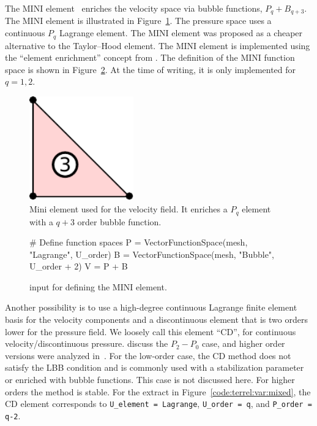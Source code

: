 The MINI element~\citep{ArnoldBrezziFortin1984} enriches the velocity
space via bubble functions, $P_q + B_{q+3}$. The MINI element is
illustrated in Figure~\ref{fig:terrel:MINIElement}.  The pressure
space uses a continuous $P_{q}$ Lagrange element.  The MINI element
was proposed as a cheaper alternative to the Taylor--Hood element. The
MINI element is implemented using the ``element enrichment'' concept
from \ufl{}. The \ufl{} definition of the MINI function space is shown
in Figure~\ref{code:terrel:MINI}.  At the time of writing, it is only
implemented for $q=1, 2$.
%
\begin{figure}
  \center
  \includegraphics[width=0.4\textwidth]{chapters/terrel/pdf/MINI.pdf}
  \caption{Mini element used for the velocity field. It enriches a $P_q$ element with
  a $q+3$ order bubble function.}
  \label{fig:terrel:MINIElement}
\end{figure}
%
\begin{figure}
\begin{python}
# Define function spaces
P = VectorFunctionSpace(mesh, "Lagrange", U_order)
B = VectorFunctionSpace(mesh, "Bubble", U_order + 2)
V = P + B
\end{python}
\caption{\ufl{} input for defining the MINI element.}
\label{code:terrel:MINI}
\end{figure}

Another possibility is to use a high-degree continuous Lagrange finite
element basis for the velocity components and a discontinuous element
that is two orders lower for the pressure field. We loosely call
this element ``CD'', for continuous velocity/discontinuous pressure.
\citet{BrezziFortin1991} discuss the $P_2-P_0$ case, and higher order
versions were analyzed in~\citet{MadayPateraRonquist1992}.  For the
low-order case, the CD method does not satisfy the LBB condition and
is commonly used with a stabilization parameter or enriched with bubble
functions. This case is not discussed here. For higher orders the method
is stable.  For the extract in Figure~\ref{code:terrel:var:mixed}, the
CD element corresponds to {\tt U\_element = Lagrange}, {\tt U\_order =
q},  and {\tt P\_order = q-2}.

